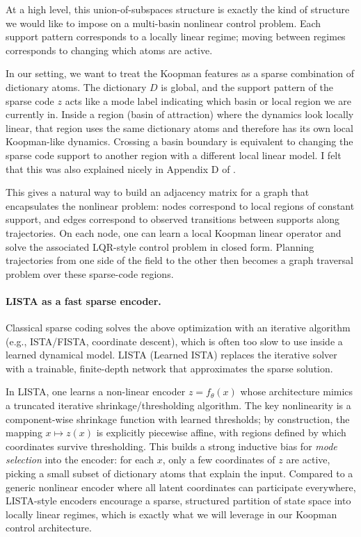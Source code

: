 At a high level, this union-of-subspaces structure is exactly the kind of structure we would like to impose on a multi-basin nonlinear control problem.
Each support pattern corresponds to a locally linear regime; moving between regimes corresponds to changing which atoms are active.

In our setting, we want to treat the Koopman features as a sparse combination of dictionary atoms.
The dictionary $D$ is global, and the support pattern of the sparse code $z$ acts like a mode label indicating which basin or local region we are currently in.
Inside a region (basin of attraction) where the dynamics look locally linear, that region uses the same dictionary atoms and therefore has its own local Koopman-like dynamics.
Crossing a basin boundary is equivalent to changing the sparse code support to another region with a different local linear model. I felt that this was also explained nicely in Appendix D of \citet{fathi2024course}.

This gives a natural way to build an adjacency matrix for a graph that encapsulates the nonlinear problem: nodes correspond to local regions of constant support, and edges correspond to observed transitions between supports along trajectories.
On each node, one can learn a local Koopman linear operator and solve the associated LQR-style control problem in closed form.
Planning trajectories from one side of the field to the other then becomes a graph traversal problem over these sparse-code regions.

\paragraph{LISTA as a fast sparse encoder.}
Classical sparse coding solves the above optimization with an iterative algorithm (e.g., ISTA/FISTA, coordinate descent), which is often too slow to use inside a learned dynamical model.
LISTA (Learned ISTA) \citep{gregor_learning_2010} replaces the iterative solver with a trainable, finite-depth network that approximates the sparse solution.

In LISTA, one learns a non-linear encoder $z = f_\theta(x)$ whose architecture mimics a truncated iterative shrinkage/thresholding algorithm.
The key nonlinearity is a component-wise shrinkage function with learned thresholds; by construction, the mapping $x \mapsto z(x)$ is explicitly piecewise affine, with regions defined by which coordinates survive thresholding.
This builds a strong inductive bias for \emph{mode selection} into the encoder: for each $x$, only a few coordinates of $z$ are active, picking a small subset of dictionary atoms that explain the input.
Compared to a generic nonlinear encoder where all latent coordinates can participate everywhere, LISTA-style encoders encourage a sparse, structured partition of state space into locally linear regimes, which is exactly what we will leverage in our Koopman control architecture.


